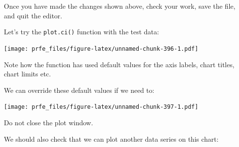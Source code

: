 \documentclass[12pt,a4paper]{book}
\newenvironment{Shaded}{\begin{snugshade}}{\end{snugshade}}
\newcommand{\KeywordTok}[1]{\textcolor[rgb]{0.13,0.29,0.53}{\textbf{#1}}}
\newcommand{\DataTypeTok}[1]{\textcolor[rgb]{0.13,0.29,0.53}{#1}}
\newcommand{\DecValTok}[1]{\textcolor[rgb]{0.00,0.00,0.81}{#1}}
\newcommand{\StringTok}[1]{\textcolor[rgb]{0.31,0.60,0.02}{#1}}
\newcommand{\OtherTok}[1]{\textcolor[rgb]{0.56,0.35,0.01}{#1}}
\newcommand{\OperatorTok}[1]{\textcolor[rgb]{0.81,0.36,0.00}{\textbf{#1}}}
\newcommand{\NormalTok}[1]{#1}
\theoremstyle{definition}
\theoremstyle{definition}
\theoremstyle{definition}
\theoremstyle{remark}
\begin{document}
Once you have made the changes shown above, check your work, save the
file, and quit the editor.

Let's try the \texttt{plot.ci()} function with the test data:

\begin{Shaded}
\end{Shaded}

\texttt{[image: prfe\_files/figure-latex/unnamed-chunk-396-1.pdf]}

Note how the function has used default values for the axis labels, chart
titles, chart limits etc.

We can override these default values if we need to:

\begin{Shaded}
\end{Shaded}

\texttt{[image: prfe\_files/figure-latex/unnamed-chunk-397-1.pdf]}

Do not close the plot window.

We should also check that we can plot another data series on this chart:

\begin{Shaded}
\end{Shaded}
\end{document}
